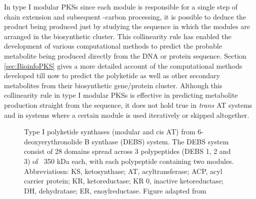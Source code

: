 			In type I modular PKSs since each module is responsible for a single step of chain extension and subsequent \bet-carbon processing, it is possible to deduce the product being produced just by studying the sequence in which the modules are arranged in the biosynthetic cluster. This collinearity rule has enabled the development of various computational methods to predict the probable metabolite being produced directly from the DNA or protein sequence. Section \ref{sec:BioinfoPKS} gives a more detailed account of the computational methods developed till now to predict the polyketide as well as other secondary metabolites from their biosynthetic gene/protein cluster. Although this collinearity rule in type I modular PKSs is effective in predicting metabolite production straight from the sequence, it does not hold true in \textit{trans} AT systems and in systems where a certain module is used iteratively or skipped altogether. 
			
			\setlength\fboxsep{5pt}
			\setlength\fboxrule{1.5pt}
			\begin{figure} [htbp]
			\centering
			\caption[Type I polyketide synthases (modular and cis AT) from 6-deoxyerythronolide B synthase
			(DEBS) system.]{Type I polyketide synthases (modular and cis AT) from 6-deoxyerythronolide B synthase
			(DEBS) system.  The DEBS system consist of 28 domains spread across 3 polypeptides (DEBS 1, 2 and 3) of ~350 kDa each, with each polypeptide containing two modules. Abbreviatiosn: KS, ketosynthase; AT, acyltransferase; ACP, acyl carrier protein; KR, ketoreductase; KR 0, inactive ketoreductase; DH,
			dehydratase; ER, enoylreductase. Figure adapted from \parencite{Khosla2007}
			}
			\label{fig:DEBS}
			\end{figure}
			
